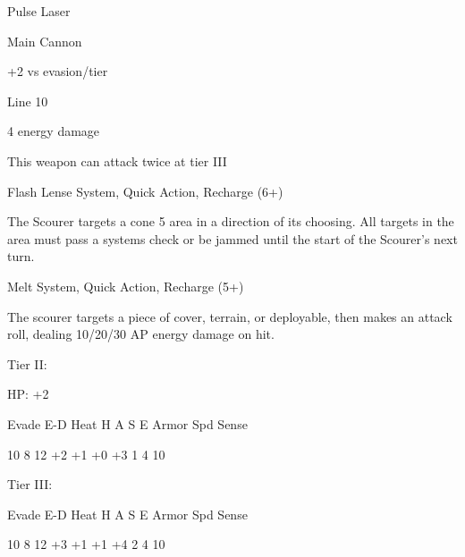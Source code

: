 Pulse Laser

Main Cannon

+2 vs evasion/tier

Line 10

4 energy damage

This weapon can attack twice at tier III


Flash Lense
System, Quick Action, Recharge (6+)

The Scourer targets a cone 5 area in a direction of its choosing. All targets in the area must pass
a systems check or be jammed until the start of the Scourer's next turn.


Melt
System, Quick Action, Recharge (5+)

The scourer targets a piece of cover, terrain, or deployable, then makes an attack roll, dealing
10/20/30 AP energy damage on hit.


Tier II:

HP: +2


          Evade    E-D    Heat     H    A     S     E       Armor        Spd      Sense

          10       8      12       +2   +1    +0    +3      1            4        10

Tier III:


          Evade    E-D    Heat     H    A     S     E       Armor        Spd      Sense

          10       8      12       +3   +1    +1    +4      2            4        10
